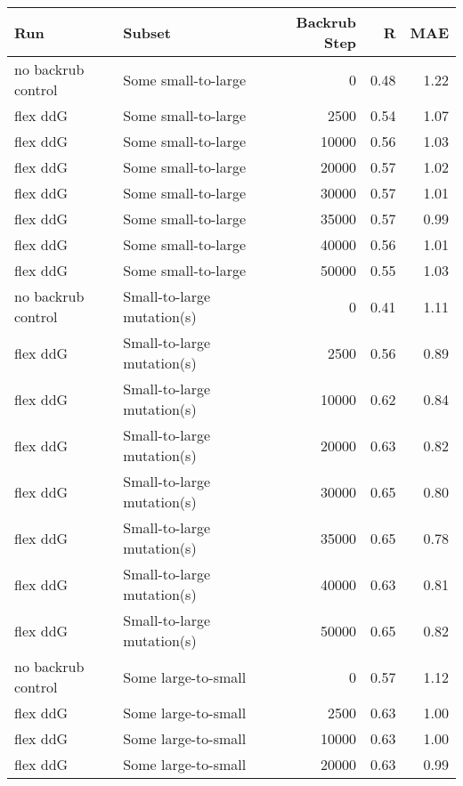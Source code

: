 \begin{table}
\begin{tabular}{llrrr}
\toprule
                Run &                      Subset &  Backrub Step &    R &  MAE \\
\midrule
 no backrub control &         Some small-to-large &             0 & 0.48 & 1.22 \\
           flex ddG &         Some small-to-large &          2500 & 0.54 & 1.07 \\
           flex ddG &         Some small-to-large &         10000 & 0.56 & 1.03 \\
           flex ddG &         Some small-to-large &         20000 & 0.57 & 1.02 \\
           flex ddG &         Some small-to-large &         30000 & 0.57 & 1.01 \\
           flex ddG &         Some small-to-large &         35000 & 0.57 & 0.99 \\
           flex ddG &         Some small-to-large &         40000 & 0.56 & 1.01 \\
           flex ddG &         Some small-to-large &         50000 & 0.55 & 1.03 \\
 no backrub control &  Small-to-large mutation(s) &             0 & 0.41 & 1.11 \\
           flex ddG &  Small-to-large mutation(s) &          2500 & 0.56 & 0.89 \\
           flex ddG &  Small-to-large mutation(s) &         10000 & 0.62 & 0.84 \\
           flex ddG &  Small-to-large mutation(s) &         20000 & 0.63 & 0.82 \\
           flex ddG &  Small-to-large mutation(s) &         30000 & 0.65 & 0.80 \\
           flex ddG &  Small-to-large mutation(s) &         35000 & 0.65 & 0.78 \\
           flex ddG &  Small-to-large mutation(s) &         40000 & 0.63 & 0.81 \\
           flex ddG &  Small-to-large mutation(s) &         50000 & 0.65 & 0.82 \\
 no backrub control &         Some large-to-small &             0 & 0.57 & 1.12 \\
           flex ddG &         Some large-to-small &          2500 & 0.63 & 1.00 \\
           flex ddG &         Some large-to-small &         10000 & 0.63 & 1.00 \\
           flex ddG &         Some large-to-small &         20000 & 0.63 & 0.99 \\

\end{tabular}
\end{table}
